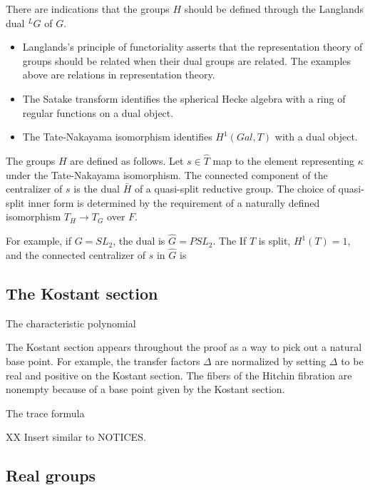 \documentclass[brochure,english,12pt]{bourbaki}
\begin{document}
There are indications that the groups $H$ should be defined through  
the Langlands dual ${}^LG$ of $G$.
\begin{itemize}
\item Langlands's principle of functoriality asserts that the
  representation theory of groups should be related when their dual
  groups are related.  The examples above are relations in
  representation theory.
\item The Satake transform identifies the spherical Hecke algebra with
  a ring of regular functions on a dual object.
\item The Tate-Nakayama isomorphism identifies $H^1(Gal,T)$
with a dual object.
\end{itemize}

The groups $H$ are defined as follows.  Let $s\in \hat T$ map
to the element representing $\kappa$ under the Tate-Nakayama isomorphism.
The connected component of the centralizer of $s$ is the dual $\bar H$
of a quasi-split reductive group.  The choice of
quasi-split inner form is determined by the requirement of a naturally
defined isomorphism $T_H\to T_G$ over $F$.

For example, if $G=SL_2$, the dual is $\hat G = PSL_2$.  The If $T$ is
split, $H^1(T)=1$, and the connected centralizer of $s$ in $\hat G$ is

\subsection{The Kostant section}

The characteristic polynomial

The Kostant section appears throughout the proof as a way to pick
out a natural base point.  For example, the transfer factors $\Delta$
are normalized by setting $\Delta$ to be real and positive on the
Kostant section.  The fibers of the Hitchin fibration are nonempty
because of a base point given by the Kostant section. 


The trace formula

XX Insert similar to NOTICES.

\subsection{Real groups}
\end{document}
